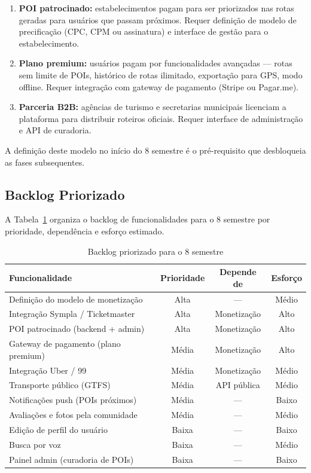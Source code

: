 \documentclass[12pt, a4paper]{article}
\begin{document}
\begin{enumerate}
  \item \textbf{POI patrocinado:} estabelecimentos pagam para ser priorizados nas rotas geradas para usu\'arios que passam pr\'oximos. Requer defini\c{c}\~ao de modelo de precifica\c{c}\~ao (CPC, CPM ou assinatura) e interface de gest\~ao para o estabelecimento.

  \item \textbf{Plano premium:} usu\'arios pagam por funcionalidades avan\c{c}adas --- rotas sem limite de POIs, hist\'orico de rotas ilimitado, exporta\c{c}\~ao para GPS, modo offline. Requer integra\c{c}\~ao com gateway de pagamento (Stripe ou Pagar.me).

  \item \textbf{Parceria B2B:} ag\^encias de turismo e secretarias municipais licenciam a plataforma para distribuir roteiros oficiais. Requer interface de administra\c{c}\~ao e API de curadoria.
\end{enumerate}

A defini\c{c}\~ao deste modelo no in\'icio do 8\textordmasculine{} semestre \'e o pr\'e-requisito que desbloqueia as fases subsequentes.

\subsection{Backlog Priorizado}

A Tabela~\ref{tab:backlog} organiza o backlog de funcionalidades para o 8\textordmasculine{} semestre por prioridade, depend\^encia e esfor\c{c}o estimado.

\begin{table}[H]
\centering
\caption{Backlog priorizado para o 8\textordmasculine{} semestre}
\label{tab:backlog}
\begin{tabular}{p{5.5cm}ccc}
\toprule
\textbf{Funcionalidade} & \textbf{Prioridade} & \textbf{Depende de} & \textbf{Esfor\c{c}o} \\
\midrule
Defini\c{c}\~ao do modelo de monetiza\c{c}\~ao & Alta & --- & M\'edio \\
Integra\c{c}\~ao Sympla / Ticketmaster & Alta & Monetiza\c{c}\~ao & Alto \\
POI patrocinado (backend + admin) & Alta & Monetiza\c{c}\~ao & Alto \\
Gateway de pagamento (plano premium) & M\'edia & Monetiza\c{c}\~ao & Alto \\
Integra\c{c}\~ao Uber / 99 & M\'edia & Monetiza\c{c}\~ao & M\'edio \\
Transporte p\'ublico (GTFS) & M\'edia & API p\'ublica & M\'edio \\
Notifica\c{c}\~oes push (POIs pr\'oximos) & M\'edia & --- & Baixo \\
Avalia\c{c}\~oes e fotos pela comunidade & M\'edia & --- & M\'edio \\
Edi\c{c}\~ao de perfil do usu\'ario & Baixa & --- & Baixo \\
Busca por voz & Baixa & --- & M\'edio \\
Painel admin (curadoria de POIs) & Baixa & --- & Baixo \\
\bottomrule
\end{tabular}
\end{table}
\end{document}
